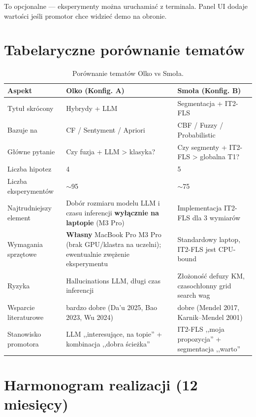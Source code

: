 \documentclass[a4paper,11pt]{article}
\begin{document}
To opcjonalne --- eksperymenty można uruchamiać z terminala. Panel UI dodaje wartości jeśli promotor chce widzieć demo na obronie.

\section{Tabelaryczne porównanie tematów}

\begin{table}[H]
\centering
\footnotesize
\begin{tabularx}{\textwidth}{Y Y Y}
\toprule
\textbf{Aspekt} & \textbf{Olko (Konfig. A)} & \textbf{Smoła (Konfig. B)} \\
\midrule
Tytuł skrócony & Hybrydy + LLM & Segmentacja + IT2-FLS \\
Bazuje na & CF / Sentyment / Apriori & CBF / Fuzzy / Probabilistic \\
Główne pytanie & Czy fuzja + LLM > klasyka? & Czy segmenty + IT2-FLS > globalna T1? \\
Liczba hipotez & 4 & 5 \\
Liczba eksperymentów & $\sim$95 & $\sim$75 \\
Najtrudniejszy element & Dobór rozmiaru modelu LLM i czasu inferencji \textbf{wyłącznie na laptopie} (M3 Pro) & Implementacja IT2-FLS dla 3 wymiarów \\
Wymagania sprzętowe & \textbf{Własny} MacBook Pro M3 Pro (brak GPU/klastra na uczelni); ewentualnie zwężenie eksperymentu & Standardowy laptop, IT2-FLS jest CPU-bound \\
Ryzyka & Hallucinations LLM, długi czas inferencji & Złożoność defuzy KM, czasochłonny grid search wag \\
Wsparcie literaturowe & bardzo dobre (Da'u 2025, Bao 2023, Wu 2024) & dobre (Mendel 2017, Karnik--Mendel 2001) \\
Stanowisko promotora & LLM ,,interesujące, na topie'' + kombinacja ,,dobra ścieżka'' & IT2-FLS ,,moja propozycja'' + segmentacja ,,warto'' \\
\bottomrule
\end{tabularx}
\caption{Porównanie tematów Olko vs Smoła.}
\end{table}

\section{Harmonogram realizacji (12 miesięcy)}
\end{document}
